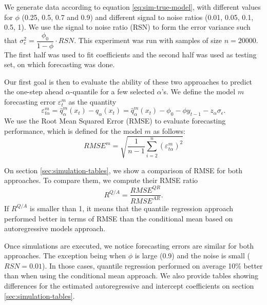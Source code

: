 We generate data according to equation \ref{eq:sim-true-model}, with different values for $\phi$ (0.25, 0.5, 0.7 and 0.9) and different signal to noise ratios (0.01, 0.05, 0.1, 0.5, 1). We use the signal to noise ratio (RSN) to form the error variance such that $\sigma_e^2 = \dfrac{\phi_0}{1-\phi} \cdot RSN$. This experiment was run with samples of size $n=20000$. The first half was used to fit coefficients and the second half was used as testing set, on which forecasting was done.

Our first goal is then to evaluate the ability of these two approaches to predict the one-step ahead $\alpha$-quantile for a few selected $\alpha$'s. We define the model $m$ forecasting error $\varepsilon_t^m$ as the quantity 
\begin{equation}
\varepsilon_{t \alpha}^m = \hat{q}^{m}_\alpha(x_t) - q_\alpha(x_t) = \hat{q}^{m}_\alpha(x_t) - \phi_0 - \phi y_{t-1} - z_\alpha \sigma_\epsilon.
\end{equation}
We use the Root Mean Squared Error (RMSE) to evaluate forecasting performance, which is defined for the model $m$ as follows:
\begin{equation}
RMSE^m = \sqrt{ \frac{1}{n-1} \sum_{i=2}^{n} \left( \varepsilon_{t \alpha}^m \right)^2}
\end{equation}

On section \ref{sec:simulation-tables}, we show a comparison of RMSE for both approaches. To compare them, we compute their RMSE ratio
\begin{equation}
R^{Q/A} = \dfrac{RMSE^{QR}}{RMSE^{AR}}.
\end{equation}
If $R^{Q/A}$ is smaller than 1, it means that the quantile regression approach performed better in terms of RMSE than the conditional mean based on autoregressive models approach.

Once simulations are executed, we notice forecasting errors are similar for both approaches. The exception being when $\phi$ is large (0.9) and the noise is small ($RSN = 0.01$). In those cases, quantile regression performed on average 10\% better than when using the conditional mean approach.
We also provide tables showing differences for the estimated autoregressive and intercept coefficients on section \ref{sec:simulation-tables}.